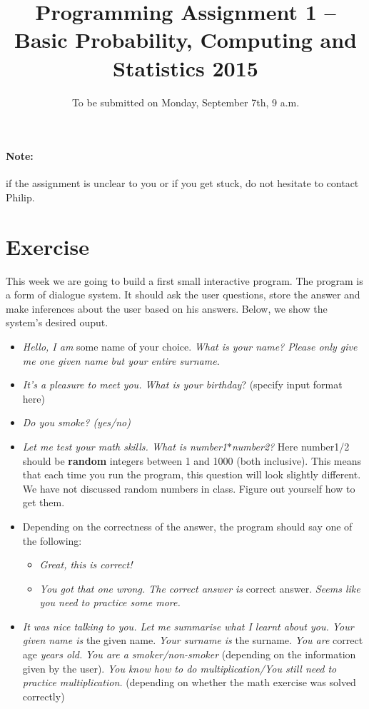 \documentclass[11pt, leqno, a4paper]{article}
\title{Programming Assignment 1 -- Basic Probability, Computing and Statistics 2015}
\author{}
\date{To be submitted on Monday, September 7th, 9 a.m.}
\begin{document}
\maketitle

\paragraph{Note:} if the assignment is unclear to you or if you get stuck, do not hesitate to contact Philip.

\section{Exercise}
This week we are going to build a first small interactive program. The program is a form of dialogue system. It should ask the user questions,
store the answer and make inferences about the user based on his answers. Below, we show the system's desired ouput. 
\begin{itemize}
\item \textit{Hello, I am} some name of your choice. \textit{What is your name? Please only give me one given name but your entire surname.}
\item \textit{It's a pleasure to meet you. What is your birthday}? (specify input format here)
\item \textit{Do you smoke? (yes/no)}
\item \textit{Let me test your math skills. What is number1$ * $number2?} Here number1/2 should be \textbf{random} integers between 1 and 1000
(both inclusive). This means that each time you run the program, this question will look slightly different. We have not discussed random
numbers in class. Figure out yourself how to get them.
\item Depending on the correctness of the answer, the program should say one of the following:
\begin{itemize}
\item \textit{Great, this is correct!}
\item \textit{You got that one wrong. The correct answer is} correct answer. \textit{Seems like you need to practice some more.}
\end{itemize}
\item \textit{It was nice talking to you. Let me summarise what I learnt about you. Your given name is} the given name. \textit{Your surname is}
the surname. \textit{You are} correct age \textit{years old.} 
\textit{You are a smoker/non-smoker} (depending on the information given by the user). \textit{You know how to do multiplication/You still
need to practice multiplication.} (depending on whether the math exercise was solved correctly)
\end{itemize}
\end{document}
